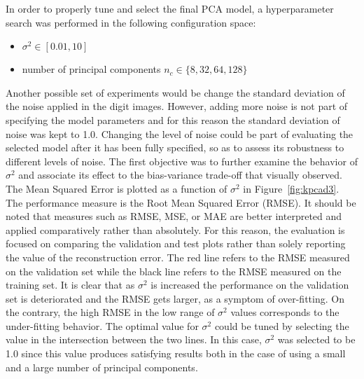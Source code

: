\documentclass[conference,compsoc]{IEEEtran}
\begin{document}
In order to properly tune and select the final PCA model, a hyperparameter search was performed in the following configuration space:
\begin{itemize}
 
 \item $\sigma^2 \in [0.01,10]$ 
 \item number of principal components $n_c \in \{8,32,64,128\}$ 

 \end{itemize}
Another possible set of experiments would be change the standard deviation of the noise applied in the digit images. However, adding more noise is not part of specifying the model parameters and for this reason the standard deviation of noise was kept to 1.0. Changing the level of noise could be part of evaluating the selected model after it has been fully specified, so as to assess its robustness to different levels of noise. The first objective was to further examine the behavior of $\sigma^2$
and associate its effect to the bias-variance trade-off that visually observed. The Mean Squared Error is plotted as a function of $\sigma^2$ in Figure~\ref{fig:kpcad3}. The performance measure is the Root Mean Squared Error (RMSE). It should be noted that measures such as RMSE, MSE, or MAE are better interpreted and applied comparatively rather than absolutely. For this reason, the evaluation is focused on comparing the validation and test plots rather than solely reporting the value of the reconstruction error. The red line refers to the RMSE measured on the validation set while the black line refers to the RMSE measured on the training set. It is clear that as $\sigma^2$ is increased the performance on the validation set is deteriorated and the RMSE gets larger, as a symptom of over-fitting. On the contrary, the high RMSE in the low range of $\sigma^2$ values corresponds to the under-fitting behavior. The optimal value for $\sigma^2$ could be tuned by selecting the value in the intersection between the two lines. In this case, $\sigma^2$ was selected to be 1.0 since this value produces satisfying results both in the case of using a small and a large number of principal components. 
\end{document}
